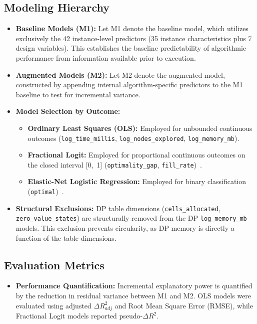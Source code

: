 \documentclass[sigconf]{acmart}
\begin{document}
\subsection{Modeling Hierarchy}
\begin{itemize}
  \item \textbf{Baseline Models (M1):} Let M1 denote the baseline model, which utilizes exclusively the 42 instance-level predictors (35 instance characteristics plus 7 design variables). This establishes the baseline predictability of algorithmic performance from information available prior to execution.
  \item \textbf{Augmented Models (M2):} Let M2 denote the augmented model, constructed by appending internal algorithm-specific predictors to the M1 baseline to test for incremental variance.
  \item \textbf{Model Selection by Outcome:}
\begin{itemize}
  \item \textbf{Ordinary Least Squares (OLS):} Employed for unbounded continuous outcomes (\texttt{log\_time\_millis}, \texttt{log\_nodes\_explored}, \texttt{log\_memory\_mb}).
  \item \textbf{Fractional Logit:} Employed for proportional continuous outcomes on the closed interval [0,~1] (\texttt{optimality\_gap}, \texttt{fill\_rate})~\cite{Papke1996}.
  \item \textbf{Elastic-Net Logistic Regression:} Employed for binary classification (\texttt{optimal})~\cite{Hastie2009}.
\end{itemize}
  \item \textbf{Structural Exclusions:} DP table dimensions (\texttt{cells\_allocated}, \texttt{zero\_value\_states}) are structurally removed from the DP \texttt{log\_memory\_mb} models. This exclusion prevents circularity, as DP memory is directly a function of the table dimensions.
\end{itemize}

\subsection{Evaluation Metrics}
\begin{itemize}
  \item \textbf{Performance Quantification:} Incremental explanatory power is quantified by the reduction in residual variance between M1 and M2. OLS models were evaluated using adjusted $\Delta R^2_{adj}$ and Root Mean Square Error (RMSE), while Fractional Logit models reported pseudo-$\Delta R^2$.
\end{itemize}
\end{document}
